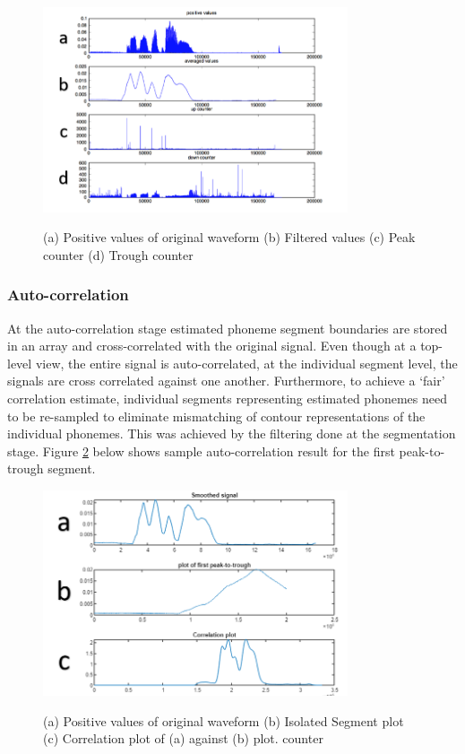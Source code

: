 \begin{figure}
\centering
  \includegraphics[width=9cm]{thesis/images/corr00}\\
  \caption{(a) Positive values of original waveform (b) Filtered values (c) Peak counter (d) Trough counter}\label{fig_c3_exp02}
\end{figure}
\subsubsection{Auto-correlation}
At the auto-correlation stage estimated phoneme segment boundaries are stored in an array and cross-correlated with the original signal.  Even though at a top-level view, the entire signal is auto-correlated, at the individual segment level, the signals are cross correlated against one another.  Furthermore, to achieve a ‘fair’ correlation estimate, individual segments representing estimated phonemes need to be re-sampled to eliminate mismatching of contour representations of the individual phonemes.  This was achieved by the filtering done at the segmentation stage.  Figure \ref{fig_c3_exp03} below shows sample auto-correlation result for the first peak-to-trough segment.
\begin{figure}
\centering
  \includegraphics[width=9cm]{thesis/images/corr01}\\
  \caption{(a) Positive values of original waveform (b) Isolated Segment plot (c) Correlation plot of (a) against (b) plot. counter}\label{fig_c3_exp03}
\end{figure}



